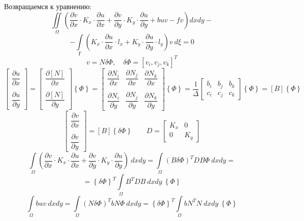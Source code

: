 	Возвращаемся к уравнению:
	\[
	\iint\limits_{\Omega} \left(\frac{\partial v}{\partial x} \cdot K_x \cdot  \frac{\partial u}{\partial x} + \frac{\partial v}{\partial y} \cdot K_y \cdot  \frac{\partial u}{\partial y} + buv-fv \right)dxdy-\]
	\[-\int\limits_{\text{Г}} \left(K_x \cdot  \frac{\partial u}{\partial x} \cdot l_x + K_y \cdot  \frac{\partial u}{\partial y} \cdot l_y \right)v\ d\xi = 0
	\]
	\[
	v=N\delta\Phi, \quad \delta\Phi=\left[v_i, v_j, v_k\right]^T
	\]
	\[
	\begin{bmatrix}
		\dfrac{\partial u}{\partial x} \\ \\ \dfrac{\partial u}{\partial y} 
	\end{bmatrix} = \begin{bmatrix}
	\dfrac{\partial \left[N\right]}{\partial x} \\  \\ \dfrac{\partial \left[N\right] }{\partial y} 
	\end{bmatrix} \left\{\Phi\right\} = \begin{bmatrix}
	\dfrac{\partial N_i}{\partial x} & \dfrac{\partial N_j}{\partial x} & \dfrac{\partial N_k}{\partial x} \\ & & \\ \dfrac{\partial N_i}{\partial y} & \dfrac{\partial N_j}{\partial y} & \dfrac{\partial N_k}{\partial y}
	\end{bmatrix} \left\{\Phi\right\} = \dfrac{1}{\Delta} \begin{bmatrix}
	b_i & b_ j & b_k \\ c_i & c_j & c_k
	\end{bmatrix} \left\{\Phi\right\} = \left[B\right] \left\{\Phi\right\}
	\]
	\[
	\begin{bmatrix}
		\dfrac{\partial v}{\partial x} \\ \\	\dfrac{\partial v}{\partial y}
	\end{bmatrix} = \left[B\right] \left\{\delta\Phi\right\} \qquad D=\begin{bmatrix}
	K_x & 0 \\ 0 & K_y
	\end{bmatrix}
	\]
	\[
	\int\limits_{\Omega} \left(\frac{\partial v}{\partial x} \cdot K_x \cdot  \frac{\partial u}{\partial x} + \frac{\partial v}{\partial y} \cdot K_y \cdot  \frac{\partial u}{\partial y}\right)\ dxdy = \int\limits_{\Omega} (B\delta\Phi)^TDB\Phi\ dxdy=
	\] 
	\[
	=\left\{ \delta \Phi \right\}^T \int\limits_{\Omega} B^T D B \ dxdy \ \left\{ \Phi \right\}
	\]
	\[
	\int\limits_{\Omega}  buv \ dxdy = \int\limits_{\Omega}  (N\delta \Phi) ^ T bN \Phi \ dxdy = \left\{ \delta \Phi \right\}^T \int\limits_{\Omega} bN^T N \ dxdy \ \left\{ \Phi \right\}
	\]
